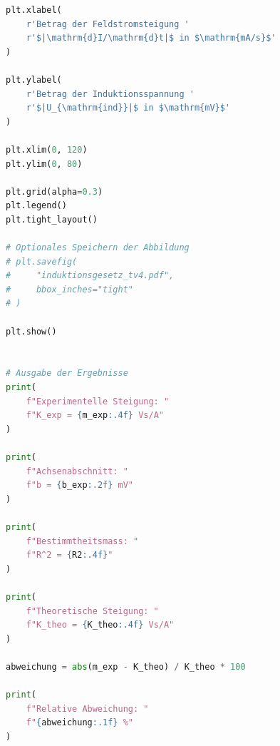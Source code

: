 \documentclass{report}
\begin{document}
\begin{scriptsize}
\begin{lstlisting}[language=python]
plt.xlabel(
    r'Betrag der Feldstromsteigung '
    r'$|\mathrm{d}I/\mathrm{d}t|$ in $\mathrm{mA/s}$'
)

plt.ylabel(
    r'Betrag der Induktionsspannung '
    r'$|U_{\mathrm{ind}}|$ in $\mathrm{mV}$'
)

plt.xlim(0, 120)
plt.ylim(0, 80)

plt.grid(alpha=0.3)
plt.legend()
plt.tight_layout()

# Optionales Speichern der Abbildung
# plt.savefig(
#     "induktionsgesetz_tv4.pdf",
#     bbox_inches="tight"
# )

plt.show()


# Ausgabe der Ergebnisse
print(
    f"Experimentelle Steigung: "
    f"K_exp = {m_exp:.4f} Vs/A"
)

print(
    f"Achsenabschnitt: "
    f"b = {b_exp:.2f} mV"
)

print(
    f"Bestimmtheitsmass: "
    f"R^2 = {R2:.4f}"
)

print(
    f"Theoretische Steigung: "
    f"K_theo = {K_theo:.4f} Vs/A"
)

abweichung = abs(m_exp - K_theo) / K_theo * 100

print(
    f"Relative Abweichung: "
    f"{abweichung:.1f} %"
)
\end{lstlisting}
\end{scriptsize}
\end{document}

